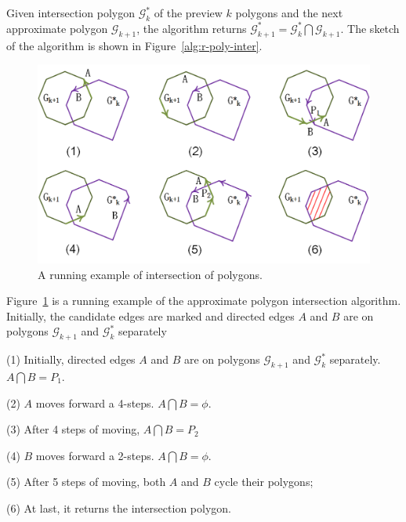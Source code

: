 \stitle{\textcolor[rgb]{0.00,0.07,1.00}{Regular polygon intersection algorithm}}
Given intersection polygon $\mathcal{G}^*_k$ of the preview $k$ polygons and the next approximate polygon $\mathcal{G}_{k+1}$, the algorithm returns $\mathcal{G}^*_{k+1} = \mathcal{G}^*_k  \bigcap \mathcal{G}_{k+1}$.
The sketch of the algorithm is shown in Figure~\ref{alg:r-poly-inter}.







\begin{figure}[tb!]
\centering
\includegraphics[scale=0.88]{figures/Fig-r-poly-inter.png}
\vspace{-1ex}
\caption{\small A running example of intersection of polygons.}
\vspace{-2ex}
\label{fig:r-poly-inter}
\end{figure}




\begin{example}
Figure~\ref{fig:r-poly-inter} is a running example of the approximate polygon intersection algorithm.
Initially, the candidate edges are marked and directed edges $A$ and $B$ are on polygons $\mathcal{G}_{k+1}$ and $\mathcal{G}^*_{k}$ separately

\ni (1) Initially, directed edges $A$ and $B$ are on polygons $\mathcal{G}_{k+1}$ and $\mathcal{G}^*_{k}$ separately. $A \bigcap B = P_1$.

\ni (2) $A$ moves forward a 4-steps. $A \bigcap B = \phi$.

\ni (3) After 4 steps of moving, $A \bigcap B = P_2$

\ni (4) $B$ moves forward a 2-steps. $A \bigcap B = \phi$.

\ni (5) After 5 steps of moving, both $A$ and $B$ cycle their polygons;

\ni (6) At last, it returns the intersection polygon.
\end{example}






